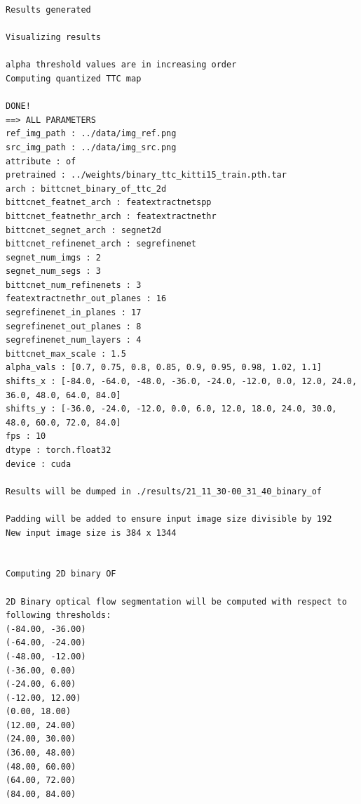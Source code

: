 \documentclass[10pt,UTF8]{ctexart}
\begin{document}
\begin{verbatim}
Results generated

Visualizing results

alpha threshold values are in increasing order
Computing quantized TTC map

DONE!
==> ALL PARAMETERS
ref_img_path : ../data/img_ref.png
src_img_path : ../data/img_src.png
attribute : of
pretrained : ../weights/binary_ttc_kitti15_train.pth.tar
arch : bittcnet_binary_of_ttc_2d
bittcnet_featnet_arch : featextractnetspp
bittcnet_featnethr_arch : featextractnethr
bittcnet_segnet_arch : segnet2d
bittcnet_refinenet_arch : segrefinenet
segnet_num_imgs : 2
segnet_num_segs : 3
bittcnet_num_refinenets : 3
featextractnethr_out_planes : 16
segrefinenet_in_planes : 17
segrefinenet_out_planes : 8
segrefinenet_num_layers : 4
bittcnet_max_scale : 1.5
alpha_vals : [0.7, 0.75, 0.8, 0.85, 0.9, 0.95, 0.98, 1.02, 1.1]
shifts_x : [-84.0, -64.0, -48.0, -36.0, -24.0, -12.0, 0.0, 12.0, 24.0, 36.0, 48.0, 64.0, 84.0]
shifts_y : [-36.0, -24.0, -12.0, 0.0, 6.0, 12.0, 18.0, 24.0, 30.0, 48.0, 60.0, 72.0, 84.0]
fps : 10
dtype : torch.float32
device : cuda

Results will be dumped in ./results/21_11_30-00_31_40_binary_of

Padding will be added to ensure input image size divisible by 192
New input image size is 384 x 1344


Computing 2D binary OF

2D Binary optical flow segmentation will be computed with respect to following thresholds:
(-84.00, -36.00)
(-64.00, -24.00)
(-48.00, -12.00)
(-36.00, 0.00)
(-24.00, 6.00)
(-12.00, 12.00)
(0.00, 18.00)
(12.00, 24.00)
(24.00, 30.00)
(36.00, 48.00)
(48.00, 60.00)
(64.00, 72.00)
(84.00, 84.00)


\end{verbatim}
\end{document}
